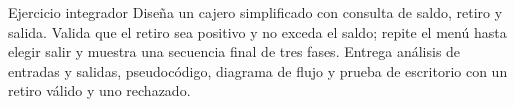 \clearpage
\begin{actividad}{Ejercicio integrador}
Diseña un cajero simplificado con consulta de saldo, retiro y salida. Valida
que el retiro sea positivo y no exceda el saldo; repite el menú hasta elegir
salir y muestra una secuencia final de tres fases. Entrega análisis de entradas
y salidas, pseudocódigo, diagrama de flujo y prueba de escritorio con un retiro
válido y uno rechazado.
\espaciorespuesta[12cm]
\end{actividad}
